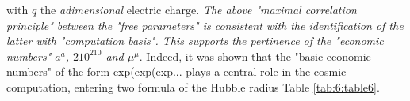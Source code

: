 \documentclass[a4paper,9pt]{article}
\begin{document}

with $q$ the \textit{adimensional} electric charge. \textit{The above "maximal correlation principle" between the "free parameters" is consistent with the identification of the latter with "computation basis". This supports the pertinence of the "economic numbers" $a^a$, $210^{210}$ and $\mu^{\mu}$}. Indeed, it was shown that the "basic economic numbers" of the form exp(exp(exp... plays a central role in the cosmic computation, entering two formula of the Hubble radius Table \ref{tab:6:table6}.

\end{document}
